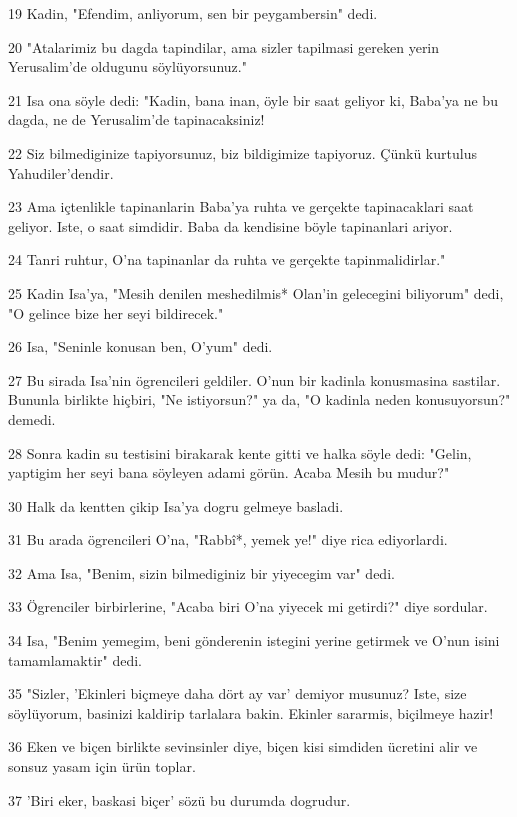 \par 19 Kadin, "Efendim, anliyorum, sen bir peygambersin" dedi.
\par 20 "Atalarimiz bu dagda tapindilar, ama sizler tapilmasi gereken yerin Yerusalim'de oldugunu söylüyorsunuz."
\par 21 Isa ona söyle dedi: "Kadin, bana inan, öyle bir saat geliyor ki, Baba'ya ne bu dagda, ne de Yerusalim'de tapinacaksiniz!
\par 22 Siz bilmediginize tapiyorsunuz, biz bildigimize tapiyoruz. Çünkü kurtulus Yahudiler'dendir.
\par 23 Ama içtenlikle tapinanlarin Baba'ya ruhta ve gerçekte tapinacaklari saat geliyor. Iste, o saat simdidir. Baba da kendisine böyle tapinanlari ariyor.
\par 24 Tanri ruhtur, O'na tapinanlar da ruhta ve gerçekte tapinmalidirlar."
\par 25 Kadin Isa'ya, "Mesih denilen meshedilmis* Olan'in gelecegini biliyorum" dedi, "O gelince bize her seyi bildirecek."
\par 26 Isa, "Seninle konusan ben, O'yum" dedi.
\par 27 Bu sirada Isa'nin ögrencileri geldiler. O'nun bir kadinla konusmasina sastilar. Bununla birlikte hiçbiri, "Ne istiyorsun?" ya da, "O kadinla neden konusuyorsun?" demedi.
\par 28 Sonra kadin su testisini birakarak kente gitti ve halka söyle dedi: "Gelin, yaptigim her seyi bana söyleyen adami görün. Acaba Mesih bu mudur?"
\par 30 Halk da kentten çikip Isa'ya dogru gelmeye basladi.
\par 31 Bu arada ögrencileri O'na, "Rabbî*, yemek ye!" diye rica ediyorlardi.
\par 32 Ama Isa, "Benim, sizin bilmediginiz bir yiyecegim var" dedi.
\par 33 Ögrenciler birbirlerine, "Acaba biri O'na yiyecek mi getirdi?" diye sordular.
\par 34 Isa, "Benim yemegim, beni gönderenin istegini yerine getirmek ve O'nun isini tamamlamaktir" dedi.
\par 35 "Sizler, 'Ekinleri biçmeye daha dört ay var' demiyor musunuz? Iste, size söylüyorum, basinizi kaldirip tarlalara bakin. Ekinler sararmis, biçilmeye hazir!
\par 36 Eken ve biçen birlikte sevinsinler diye, biçen kisi simdiden ücretini alir ve sonsuz yasam için ürün toplar.
\par 37 'Biri eker, baskasi biçer' sözü bu durumda dogrudur.
